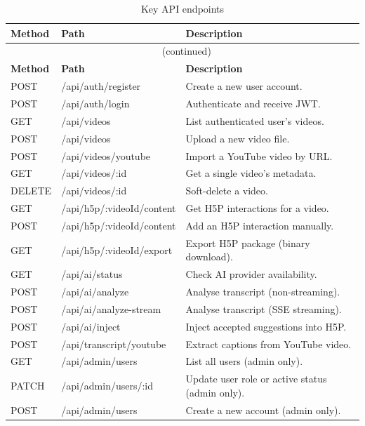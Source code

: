 \begin{longtable}{lll}
  \caption{Key API endpoints} \label{tab:api_ref} \\
  \toprule
  \textbf{Method} & \textbf{Path} & \textbf{Description} \\
  \midrule
  \endfirsthead
  \multicolumn{3}{c}{\tablename\ \thetable{} (continued)} \\
  \toprule
  \textbf{Method} & \textbf{Path} & \textbf{Description} \\
  \midrule
  \endhead
  \bottomrule
  \endlastfoot
  POST & /api/auth/register        & Create a new user account. \\
  POST & /api/auth/login            & Authenticate and receive JWT. \\
  GET  & /api/videos                & List authenticated user's videos. \\
  POST & /api/videos                & Upload a new video file. \\
  POST & /api/videos/youtube        & Import a YouTube video by URL. \\
  GET  & /api/videos/:id            & Get a single video's metadata. \\
  DELETE & /api/videos/:id          & Soft-delete a video. \\
  GET  & /api/h5p/:videoId/content  & Get H5P interactions for a video. \\
  POST & /api/h5p/:videoId/content  & Add an H5P interaction manually. \\
  GET  & /api/h5p/:videoId/export   & Export H5P package (binary download). \\
  GET  & /api/ai/status             & Check AI provider availability. \\
  POST & /api/ai/analyze            & Analyse transcript (non-streaming). \\
  POST & /api/ai/analyze-stream     & Analyse transcript (SSE streaming). \\
  POST & /api/ai/inject             & Inject accepted suggestions into H5P. \\
  POST & /api/transcript/youtube    & Extract captions from YouTube video. \\
  GET  & /api/admin/users           & List all users (admin only). \\
  PATCH & /api/admin/users/:id      & Update user role or active status (admin only). \\
  POST & /api/admin/users           & Create a new account (admin only). \\

\end{longtable}
